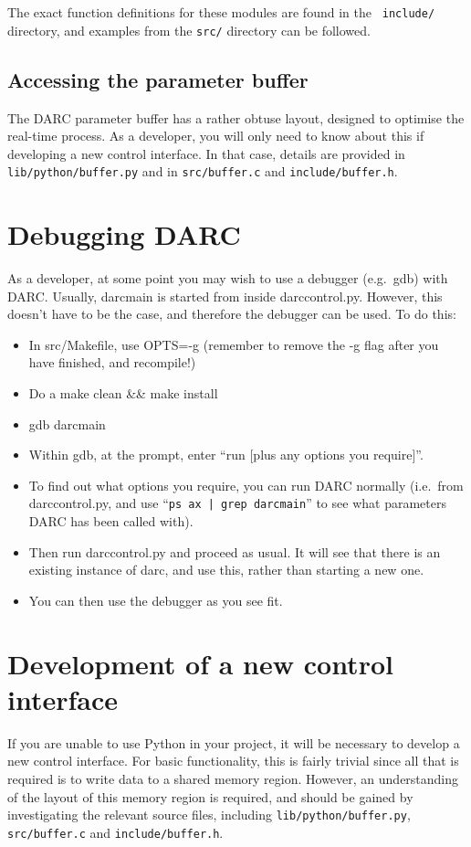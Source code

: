 \documentclass[a4,10pt]{article}
\begin{document}
The exact function definitions for these modules are found in the {\tt
  include/} directory, and examples from the {\tt src/} directory can
be followed.

\subsection{Accessing the parameter buffer}
The DARC parameter buffer has a rather obtuse layout, designed to
optimise the real-time process.  As a developer, you will only need to
know about this if developing a new control interface.  In that case,
details are provided in {\tt lib/python/buffer.py} and in {\tt src/buffer.c}
and {\tt include/buffer.h}.

\section{Debugging DARC}
As a developer, at some point you may wish to use a debugger
(e.g.\ gdb) with DARC.  Usually, darcmain is started from inside
darccontrol.py.  However, this doesn't have to be the case, and
therefore the debugger can be used.  To do this:
\begin{itemize}
\item In src/Makefile, use OPTS=-g (remember to remove the -g flag
  after you have finished, and recompile!)
\item Do a make clean \&\& make install
\item gdb darcmain
\item Within gdb, at the prompt, enter ``run [plus any options you
  require]''.
\item To find out what options you require, you can run DARC normally
  (i.e.\ from darccontrol.py, and use ``{\tt ps ax | grep darcmain}'' to see
  what parameters DARC has been called with).
\item Then run darccontrol.py and proceed as usual.  It will see that
  there is an existing instance of darc, and use this, rather than
  starting a new one.
\item You can then use the debugger as you see fit.
\end{itemize}

\section{Development of a new control interface}
If you are unable to use Python in your project, it will be necessary
to develop a new control interface.  For basic functionality, this is
fairly trivial since all that is required is to write data to a shared
memory region.  However, an understanding of the layout of this memory
region is required, and should be gained by investigating the relevant
source files, including {\tt lib/python/buffer.py}, {\tt src/buffer.c}
and {\tt include/buffer.h}.
\end{document}
